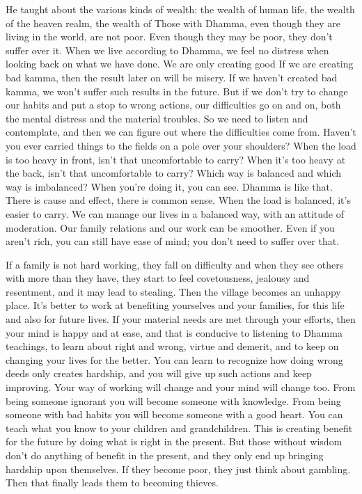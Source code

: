 He taught about the various kinds of wealth: the wealth of human life, the wealth of the heaven realm, the wealth of  Those with Dhamma, even though they are living in the world, are not poor. Even though they may be poor, they don't suffer over it. When we live according to Dhamma, we feel no distress when looking back on what we have done. We are only creating good  If we are creating bad kamma, then the result later on will be misery. If we haven't created bad kamma, we won't suffer such results in the future. But if we don't try to change our habits and put a stop to wrong actions, our difficulties go on and on, both the mental distress and the material troubles. So we need to listen and contemplate, and then we can figure out where the difficulties come from. Haven't you ever carried things to the fields on a pole over your shoulders? When the load is too heavy in front, isn't that uncomfortable to carry? When it's too heavy at the back, isn't that uncomfortable to carry? Which way is balanced and which way is imbalanced? When you're doing it, you can see. Dhamma is like that. There is cause and effect, there is common sense. When the load is balanced, it's easier to carry. We can manage our lives in a balanced way, with an attitude of moderation. Our family relations and our work can be smoother. Even if you aren't rich, you can still have ease of mind; you don't need to suffer over that.

If a family is not hard working, they fall on difficulty and when they see others with more than they have, they start to feel covetousness, jealousy and resentment, and it may lead to stealing. Then the village becomes an unhappy place. It's better to work at benefiting yourselves and your families, for this life and also for future lives. If your material needs are met through your efforts, then your mind is happy and at ease, and that is conducive to listening to Dhamma teachings, to learn about right and wrong, virtue and demerit, and to keep on changing your lives for the better. You can learn to recognize how doing wrong deeds only creates hardship, and you will give up such actions and keep improving. Your way of working will change and your mind will change too. From being someone ignorant you will become someone with knowledge. From being someone with bad habits you will become someone with a good heart. You can teach what you know to your children and grandchildren. This is creating benefit for the future by doing what is right in the present. But those without wisdom don't do anything of benefit in the present, and they only end up bringing hardship upon themselves. If they become poor, they just think about gambling. Then that finally leads them to becoming thieves.

